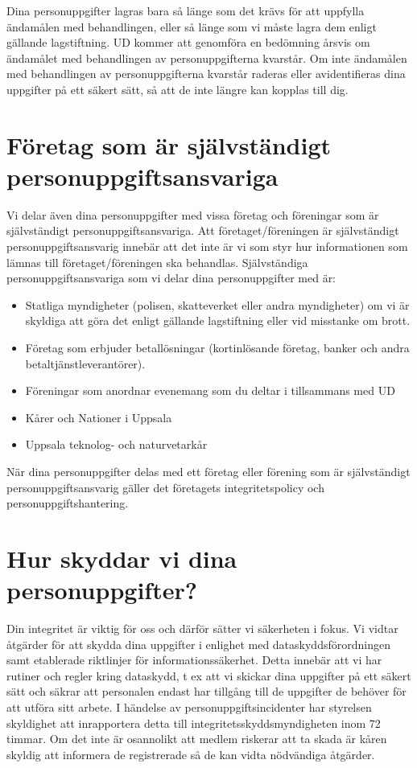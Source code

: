 \documentclass[a4paper]{article}
\begin{document}
Dina personuppgifter lagras bara så länge som det krävs för att uppfylla ändamålen
med behandlingen, eller så länge som vi måste lagra dem enligt gällande lagstiftning.
UD kommer att genomföra en bedömning årsvis om ändamålet med behandlingen av
personuppgifterna kvarstår. Om inte ändamålen med behandlingen av
personuppgifterna kvarstår raderas eller avidentifieras dina uppgifter på ett säkert sätt,
så att de inte längre kan kopplas till dig.



\section{Företag som är självständigt personuppgiftsansvariga}

Vi delar även dina personuppgifter med vissa företag och föreningar som är självständigt
personuppgiftsansvariga. Att företaget/föreningen är självständigt personuppgiftsansvarig innebär att det inte är vi som styr hur informationen som lämnas till företaget/föreningen ska behandlas. Självständiga personuppgiftsansvariga som vi delar dina personuppgifter med är:

\begin{itemize}
    \item Statliga myndigheter (polisen, skatteverket eller andra myndigheter) om vi är
    skyldiga att göra det enligt gällande lagstiftning eller vid misstanke om brott.

    \item Företag som erbjuder betallösningar (kortinlösande företag, banker och andra
    betaltjänstleverantörer).
    \item Föreningar som anordnar evenemang som du deltar i tillsammans med UD
    \item Kårer och Nationer i Uppsala
    \item Uppsala teknolog- och naturvetarkår
\end{itemize}

När dina personuppgifter delas med ett företag eller förening som är självständigt
personuppgiftsansvarig gäller det företagets integritetspolicy och
personuppgiftshantering.



\section{Hur skyddar vi dina personuppgifter?}

Din integritet är viktig för oss och därför sätter vi säkerheten i fokus. Vi vidtar åtgärder
för att skydda dina uppgifter i enlighet med dataskyddsförordningen samt etablerade
riktlinjer för informationssäkerhet. Detta innebär att vi har rutiner och regler kring
dataskydd, t ex att vi skickar dina uppgifter på ett säkert sätt och säkrar att personalen
endast har tillgång till de uppgifter de behöver för att utföra sitt arbete.
I händelse av personuppgiftsincidenter har styrelsen skyldighet att inrapportera detta till
integritetsskyddsmyndigheten inom 72 timmar. Om det inte är osannolikt att medlem
riskerar att ta skada är kåren skyldig att informera de registrerade så de kan vidta
nödvändiga åtgärder.
\end{document}
